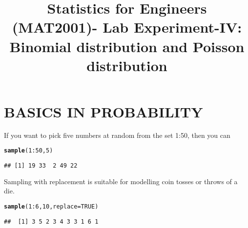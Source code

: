 \documentclass{article}\usepackage[]{graphicx}\usepackage[]{xcolor}
\date{}
\title{Statistics for Engineers (MAT2001)- Lab  Experiment-IV:  Binomial distribution and Poisson distribution}
\makeatletter
\newcommand{\hlnum}[1]{\textcolor[rgb]{0.686,0.059,0.569}{#1}}%
\newcommand{\hlopt}[1]{\textcolor[rgb]{0,0,0}{#1}}%
\newcommand{\hldef}[1]{\textcolor[rgb]{0.345,0.345,0.345}{#1}}%
\newcommand{\hlkwc}[1]{\textcolor[rgb]{0.333,0.667,0.333}{#1}}%
\newcommand{\hlkwd}[1]{\textcolor[rgb]{0.737,0.353,0.396}{\textbf{#1}}}%
\newenvironment{kframe}{%
 \def\at@end@of@kframe{}%
 \ifinner\ifhmode%
  \def\at@end@of@kframe{\end{minipage}}%
  \begin{minipage}{\columnwidth}%
 \fi\fi%
 \def\FrameCommand##1{\hskip\@totalleftmargin \hskip-\fboxsep
 \colorbox{shadecolor}{##1}\hskip-\fboxsep
     \hskip-\linewidth \hskip-\@totalleftmargin \hskip\columnwidth}%
 \MakeFramed {\advance\hsize-\width
   \@totalleftmargin\z@ \linewidth\hsize
   \@setminipage}}%
 {\par\unskip\endMakeFramed%
 \at@end@of@kframe}
\newenvironment{knitrout}{}{} %
\makeatother
\begin{document}
\maketitle

\section{BASICS IN PROBABILITY}
If you want to pick five numbers at random from the set 1:50, then you can
\begin{knitrout}
\color{fgcolor}\begin{kframe}
\begin{alltt}
\hlkwd{sample}\hldef{(}\hlnum{1}\hlopt{:}\hlnum{50}\hldef{,}\hlnum{5}\hldef{)}
\end{alltt}
\begin{verbatim}
## [1] 19 33  2 49 22
\end{verbatim}
\end{kframe}
\end{knitrout}
Sampling with replacement is suitable for modelling coin tosses or throws of a die.
\begin{knitrout}
\color{fgcolor}\begin{kframe}
\begin{alltt}
\hlkwd{sample}\hldef{(}\hlnum{1}\hlopt{:}\hlnum{6}\hldef{,}\hlnum{10}\hldef{,}\hlkwc{replace}\hldef{=}\hlnum{TRUE}\hldef{)}
\end{alltt}
\begin{verbatim}
##  [1] 3 5 2 3 4 3 3 1 6 1
\end{verbatim}
\end{kframe}
\end{knitrout}
\end{document}
